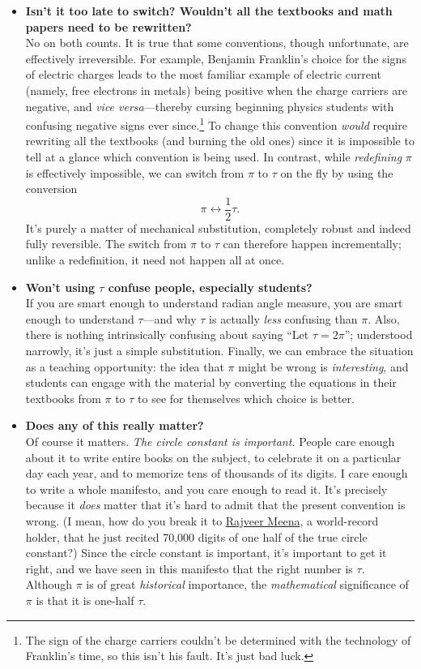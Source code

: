 \begin{itemize}
  \item \textbf{Isn't it too late to switch? Wouldn't all the textbooks and math papers need to be rewritten?} \\ No on both counts. It is true that some conventions, though unfortunate, are effectively irreversible. For example, Benjamin Franklin's choice for the signs of electric charges leads to the most familiar example of electric current (namely, free electrons in metals) being positive when the charge carriers are negative, and \emph{vice versa}---thereby cursing beginning physics students with confusing negative signs ever since.\footnote{The sign of the charge carriers couldn't be determined with the technology of Franklin's time, so this isn't his fault. It's just bad luck.} To change this convention \emph{would} require rewriting all the textbooks (and burning the old ones) since it is impossible to tell at a glance which convention is being used. In contrast, while \emph{redefining} $\pi$ is effectively impossible, we can switch from $\pi$ to $\tau$ on the fly by using the conversion \[ \pi \leftrightarrow \textstyle{\frac{1}{2}}\tau. \] It's purely a matter of mechanical substitution, completely robust and indeed fully reversible. The switch from $\pi$ to $\tau$ can therefore happen incrementally; unlike a redefinition, it need not happen all at once.

  \item \textbf{Won't using $\tau$ confuse people, especially students?} \\  If you are smart enough to understand radian angle measure, you are smart enough to understand $\tau$---and  why $\tau$ is actually \emph{less} confusing than $\pi$. Also, there is nothing intrinsically confusing about saying ``Let $\tau = 2\pi$''; understood narrowly, it's just a simple substitution. Finally, we can embrace the situation as a teaching opportunity: the idea that $\pi$ might be wrong is \emph{interesting}, and students can engage with the material by converting the equations in their textbooks from $\pi$ to $\tau$ to see for themselves which choice is better.

  \item \textbf{Does any of this really matter?} \\ Of course it matters. \emph{The circle constant is important.} People care enough about it to write entire books on the subject, to celebrate it on a particular day each year, and to memorize tens of thousands of its digits. I care enough to write a whole manifesto, and you care enough to read it. It's precisely because it \emph{does} matter that it's hard to admit that the present convention is wrong. (I mean, how do you break it to \href{https://www.guinnessworldrecords.com/world-records/most-pi-places-memorised}{Rajveer Meena}, a world-record holder, that he just recited 70,000 digits of one half of the true circle constant?) Since the circle constant is important, it's important to get it right, and we have seen in this manifesto that the right number is $\tau$. Although $\pi$ is of great \emph{historical} importance, the \emph{mathematical} significance of $\pi$ is that it is one-half $\tau$.


\end{itemize}
